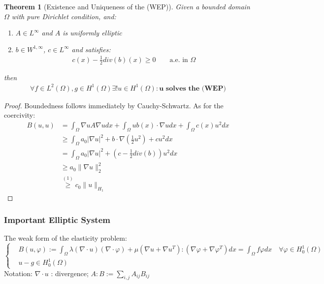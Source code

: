 \documentclass[a4paper,11pt,oneside,fleqn]{book}
\newtheorem{theorem}{Theorem}[section]
\theoremstyle{definition}
\theoremstyle{remark}
\begin{document}
\begin{theorem}[Existence and Uniqueness of the (WEP)]
	  Given a bounded domain $\Omega$ with pure Dirichlet condition, and:
	  \begin{enumerate}
	  	\item $A \in L^\infty$ and $A$ is uniformly elliptic
	  	\item $b \in W^{1, \infty}$, $c \in L^\infty$ and satisfies:
	  	\begin{align*}
	  		c(x) - \frac{1}{2}div(b)(x) \geq 0 \qquad \text{a.e. in $\Omega$}
	  	\end{align*}
	  \end{enumerate}
	  then 
	  \begin{align*}
	  	\forall f \in L^2(\Omega), g \in H^1(\Omega)\exists!u \in H^1(\Omega): \textbf{u solves the (WEP)}
	  \end{align*}
\end{theorem}
\begin{proof}
Boundedness follows immediately by Cauchy-Schwartz. As for the coercivity:
\begin{align*}
	B(u, u) &= \int_\Omega \nabla u A \nabla u dx + \int_\Omega u  b(x) \cdot  \nabla u dx + \int_\Omega c(x) u^2 dx \\
	&\geq \int_\Omega a_0 |\nabla u|^2 + b \cdot \nabla (\frac{1}{2} u^2) + cu^2 dx\\
	&= \int_\Omega a_0 |\nabla u|^2 + (c -\frac{1}{2}div(b))u^2 dx \\
	&\geq a_0 \|\nabla u\|^2_2 \\
	&\overset{(1)}{\geq} c_0 \|u\|_{H_1} 
\end{align*}
\end{proof}

\subsubsection*{Important Elliptic System}
The weak form of the elasticity problem:
\begin{equation}
\left\{
\begin{aligned}
	&B(u, \varphi) := \int_\Omega \lambda (\nabla \cdot u)(\nabla \cdot \varphi) + \mu (\nabla u + \nabla u^T) :(\nabla \varphi + \nabla \varphi^T)dx = \int_\Omega f \varphi dx \quad \forall \varphi \in H^1_0(\Omega) \\
	&u - g \in H^1_0(\Omega)
\end{aligned}	
\right.
\end{equation}
Notation: $\nabla \cdot u$ : divergence; $A:B := \sum_{i,j} A_{ij}B_{ij}$
\end{document}
